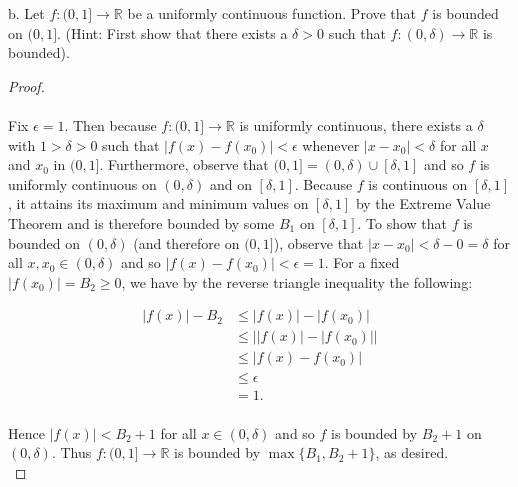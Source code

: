     \pagebreak

b.  Let $f:(0, 1] \to \mathbb{R}$ be a uniformly continuous function. Prove that
    $f$ is bounded on $(0, 1]$. (Hint: First show that there exists a
    $\delta > 0$ such that $f:(0, \delta)\to\mathbb{R}$ is bounded). \ \\

    \begin{proof}\ \\\\
        Fix $\epsilon = 1$. Then because $f:(0, 1] \to \mathbb{R}$ is uniformly continuous, there exists a $\delta$ with
        $1 > \delta > 0$ such that $|f(x) - f(x_0)| < \epsilon$ whenever $|x - x_0| < \delta$ for all $x$ and $x_0$ in
        $(0, 1]$. Furthermore, observe that $(0, 1] = (0, \delta) \cup [\delta, 1]$ and so $f$ is uniformly continuous on 
        $(0, \delta)$ and on $[\delta, 1]$. Because $f$ is continuous on $[\delta, 1]$, it attains its maximum
        and minimum values on $[\delta, 1]$ by the Extreme Value Theorem and is therefore bounded by some $B_1$ on 
        $[\delta, 1]$. To show that $f$ is bounded on $(0, \delta)$ (and therefore on $(0, 1]$), observe that 
        $|x - x_0| < \delta - 0 = \delta$ for all $x, x_0 \in (0, \delta)$ and so $|f(x) - f(x_0)| < \epsilon = 1$. For 
        a fixed $|f(x_0)| = B_2 \ge 0$, we have by the reverse triangle inequality the following:

        \begin{align*}
            |f(x)| - B_2 &\le |f(x)| - |f(x_0)| \\
                         &\le \big| |f(x)| - |f(x_0)| \big| \\
                         &\le |f(x) - f(x_0)| \\
                         &\le \epsilon \\
                         &= 1. \\
        \end{align*}

        Hence $|f(x)| < B_2 + 1$ for all $x \in (0, \delta)$ and so $f$ is bounded  by $B_2 + 1$ on $(0, \delta)$. Thus
        $f:(0, 1] \to \mathbb{R}$ is bounded by $\max{\{B_1, B_2 + 1\}}$, as desired.
        \ \\
    \end{proof}

    \pagebreak